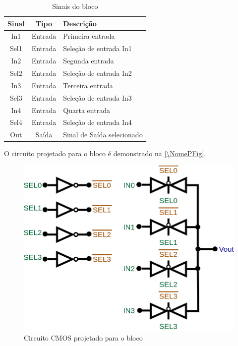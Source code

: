 \begin{table}[htbp]
\caption{Sinais do bloco \NomeBloco}
\label{\NomeSTab}
\centering
\begin{tabular}{ccl}

    \toprule
    Sinal & Tipo    & Descrição        \\
    \midrule \midrule
    In1    & Entrada & Primeira entrada \\
    \midrule
    Sel1    & Entrada & Seleção de entrada In1 \\
    \midrule
    In2    & Entrada & Segunda entrada \\
    \midrule
    Sel2    & Entrada & Seleção de entrada In2 \\
    \midrule
    In3    & Entrada & Terceira entrada \\
    \midrule
    Sel3    & Entrada & Seleção de entrada In3 \\
    \midrule
    In4    & Entrada & Quarta entrada \\
    \midrule
    Sel4    & Entrada & Seleção de entrada In4 \\
    \midrule
    Out   & Saída   & Sinal de Sa\'ida selecionado   \\
    \bottomrule
\end{tabular}
\end{table}

O circuito projetado para o bloco \'e demonstrado na \autoref{\NomePFig}.

\begin{figure}[htb]
 \centering
    \centering
    \caption{Circuito CMOS projetado para o bloco \NomeBloco} \label{\NomePFig}
    \includegraphics[scale=0.3]{Circuitos/sel4x1.png}
\end{figure}

